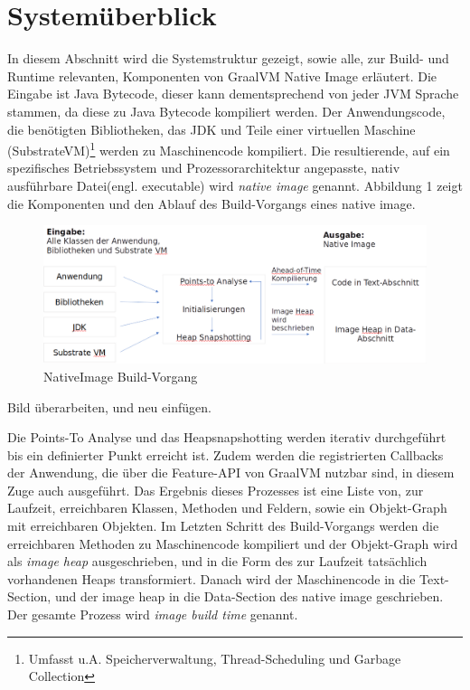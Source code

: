 \section{Systemüberblick}
\label{sec:system}
In diesem Abschnitt wird die Systemstruktur gezeigt, sowie alle, zur Build- und Runtime relevanten, Komponenten von GraalVM Native Image erläutert.
Die Eingabe ist Java Bytecode, dieser kann dementsprechend von jeder JVM Sprache stammen, da diese zu Java Bytecode kompiliert werden. Der Anwendungscode, die benötigten Bibliotheken, das JDK und Teile einer virtuellen Maschine (SubstrateVM)\footnote{Umfasst u.A. Speicherverwaltung, Thread-Scheduling und Garbage Collection} werden zu Maschinencode kompiliert. Die resultierende, auf ein spezifisches Betriebssystem und Prozessorarchitektur angepasste, nativ ausführbare Datei(engl. executable) wird \textit{native image} genannt. Abbildung 1 zeigt die Komponenten und den Ablauf des Build-Vorgangs eines native image.

\begin{figure}[h]
	\centering
	\includegraphics[width=1\textwidth]{resources/GraalVM_BuildTime.png}
	\caption{NativeImage Build-Vorgang}
	\label{fig:system_buildtime}
\end{figure}

\begin{todo}
	Bild überarbeiten, und neu einfügen.
\end{todo}

Die Points-To Analyse und das Heapsnapshotting werden iterativ durchgeführt bis ein definierter Punkt erreicht ist. Zudem werden die registrierten Callbacks der Anwendung, die über die Feature-API von GraalVM nutzbar sind, in diesem Zuge auch ausgeführt. Das Ergebnis dieses Prozesses ist eine Liste von, zur Laufzeit, erreichbaren Klassen, Methoden und Feldern, sowie ein Objekt-Graph mit erreichbaren Objekten. Im Letzten Schritt des Build-Vorgangs werden die erreichbaren Methoden zu Maschinencode kompiliert und der Objekt-Graph wird als \textit{image heap} ausgeschrieben, und in die Form des zur Laufzeit tatsächlich vorhandenen Heaps transformiert. Danach wird der Maschinencode in die Text-Section, und der image heap in die Data-Section \cite[Fig. 1-13]{TISC1995} des native image geschrieben. Der gesamte Prozess wird \textit{image build time} genannt\cite{Wimmer2019}.

